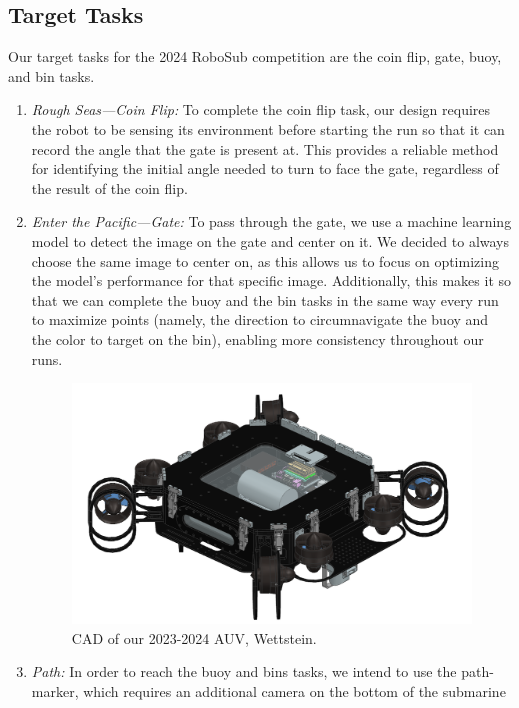 \documentclass[conference]{IEEEtran}
\begin{document}
\subsection{Target Tasks} \label{ssec:target_goals}
Our target tasks for the 2024 RoboSub competition are the coin flip, gate, buoy, and bin tasks.
\begin{enumerate}
\item \textit{Rough Seas---Coin Flip:}
To complete the coin flip task, our design requires the robot to be sensing its environment before starting the run so that it can record the angle that the gate is present at. This provides a reliable method for identifying the initial angle needed to turn to face the gate, regardless of the result of the coin flip. 
\item \textit{Enter the Pacific---Gate:}
To pass through the gate, we use a machine learning model to detect the image on the gate and center on it. We decided to always choose the same image to center on, as this allows us to focus on optimizing the model’s performance for that specific image. Additionally, this makes it so that we can complete the buoy and the bin tasks in the same way every run to maximize points (namely, the direction to circumnavigate the buoy and the color to target on the bin), enabling more consistency throughout our runs.
\begin{figure}
    \centerline{\includegraphics[scale=0.17]{images/fullSub2024.png}}
    \caption{CAD of our 2023-2024 AUV, Wettstein.}
    \label{fig:sub4}
\end{figure}
\item \textit{Path:}
In order to reach the buoy and bins tasks, we intend to use the path-marker, which requires an additional camera on the bottom of the submarine

\end{enumerate}
\end{document}
